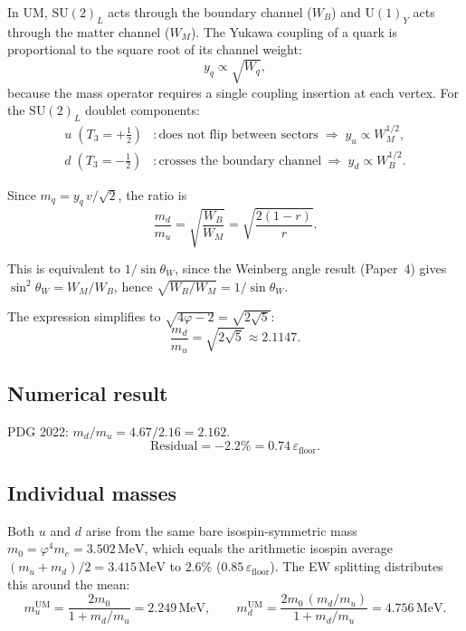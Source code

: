 \documentclass[12pt]{article}
\begin{document}
In UM, $\mathrm{SU}(2)_L$ acts through the boundary channel ($W_B$) and
$\mathrm{U}(1)_Y$ acts through the matter channel ($W_M$). The Yukawa coupling
of a quark is proportional to the square root of its channel weight:
\begin{equation}
  y_q \propto \sqrt{W_q},
\end{equation}
because the mass operator requires a single coupling insertion at each vertex.
For the $\mathrm{SU}(2)_L$ doublet components:
\begin{align}
  u\;(T_3 = +\tfrac{1}{2})&:
    \text{does not flip between sectors}
    \;\Rightarrow\; y_u \propto W_M^{1/2}, \\
  d\;(T_3 = -\tfrac{1}{2})&:
    \text{crosses the boundary channel}
    \;\Rightarrow\; y_d \propto W_B^{1/2}.
\end{align}

Since $m_q = y_q\,v/\sqrt{2}$, the ratio is
\begin{equation}
  \boxed{\frac{m_d}{m_u} = \sqrt{\frac{W_B}{W_M}} = \sqrt{\frac{2(1-r)}{r}}.}
  \label{eq:udrat}
\end{equation}

This is equivalent to $1/\!\sin\theta_W$, since the Weinberg angle result
(Paper~4) gives $\sin^2\!\theta_W = W_M/W_B$, hence
$\sqrt{W_B/W_M} = 1/\!\sin\theta_W$.

The expression simplifies to $\sqrt{4\varphi - 2} = \sqrt{2\sqrt{5}}$:
\begin{equation}
  \frac{m_d}{m_u} = \sqrt{2\sqrt{5}} \approx 2.1147.
  \label{eq:udval}
\end{equation}

\subsection{Numerical result}

PDG 2022: $m_d/m_u = 4.67/2.16 = 2.162$.
\[
  \text{Residual} = -2.2\% = 0.74\,\varepsilon_{\text{floor}}.
\]

\subsection{Individual masses}

Both $u$ and $d$ arise from the same bare isospin-symmetric mass
$m_0 = \varphi^4 m_e = 3.502\,\text{MeV}$, which equals the arithmetic
isospin average $(m_u + m_d)/2 = 3.415\,\text{MeV}$ to $2.6\%$
($0.85\,\varepsilon_{\text{floor}}$). The EW splitting distributes this
around the mean:
\begin{equation}
  m_u^{\text{UM}} = \frac{2m_0}{1 + m_d/m_u} = 2.249\,\text{MeV},
  \qquad
  m_d^{\text{UM}} = \frac{2m_0\,(m_d/m_u)}{1 + m_d/m_u} = 4.756\,\text{MeV}.
\end{equation}
\end{document}
